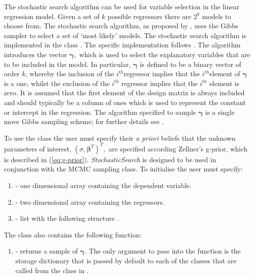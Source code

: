 \documentclass[article]{jss}
\begin{document}
The stochastic search algorithm can be used for variable selection in
the linear regression model. Given a set of $k$ possible regressors
there are $2^{k}$ models to choose from. The stochastic search
algorithm, as proposed by \citet{GeorgeMcCulloch1993}, uses the Gibbs
sampler to select a set of `most likely' models. The stochastic search
algorithm is implemented in the class . The
specific implementation follows \citet{MarinRobert2007}. The algorithm
introduces the vector $\bm{\gamma},$ which is used to select the
explanatory variables that are to be included in the model. In
particular, $\bm{\gamma}$ is defined to be a binary vector of order
$k$, whereby the inclusion of the $i^{th}$regressor implies that
the $i^{th}$element of $\bm{\gamma}$ is a one, whilst the exclusion of
the $i^{th}$ regressor implies that the $i^{th}$ element is zero.
It is assumed that the first element of the design matrix is always
included and should typically be a column of ones which is used to
represent the constant or intercept in the regression. The algorithm
specified to sample $\bm{\gamma}$ is a single move Gibbs sampling
scheme; for further details see \citet{MarinRobert2007}.

To use the class the user must specify their
\emph{a priori} beliefs that the unknown parameters of interest,
$(\sigma,\bm{\beta}^{T})^{T},$ are specified according Zellner's
g-prior, which is described in (\ref{eq:g-prior}).
\emph{StochasticSearch }is designed to be used in conjunction with the
MCMC sampling class. To initialise  the user
must specify:
\begin{enumerate}
\item {} - one dimensional  array containing the dependent variable. 
\item {} - two dimensional  array containing the regressors. 
\item {} - list with the following structure \code{{[}betaubar, g{]}}.
\end{enumerate}
The class  also contains the following function:
\begin{enumerate}
\item {} - returns a sample of $\bm{\gamma}.$ The
  only argument to pass into the function  is the storage
  dictionary that is passed by default to each of the classes that are
  called from the class in .
\end{enumerate}
\end{document}
